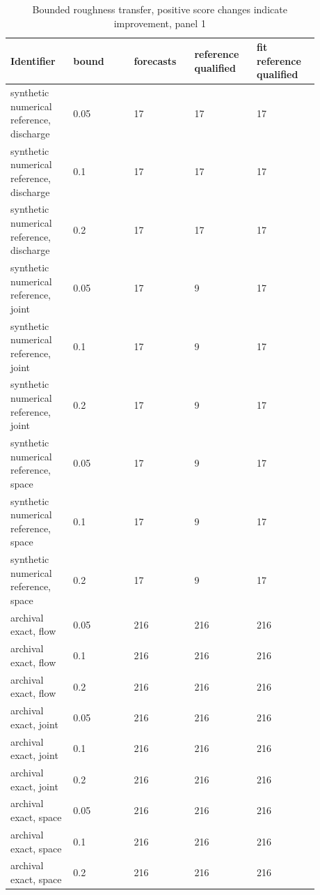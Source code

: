 \begingroup
\small
\setlength{\tabcolsep}{2pt}
\begin{longtable}{p{0.1760\linewidth}p{0.1760\linewidth}p{0.1760\linewidth}p{0.1760\linewidth}p{0.1760\linewidth}}
\caption{Bounded roughness transfer, positive score changes indicate improvement, panel 1}\\
\hline
Identifier & bound & forecasts & reference qualified & fit reference qualified \\
\hline\endhead
synthetic numerical reference, discharge & 0.05 & 17 & 17 & 17 \\
synthetic numerical reference, discharge & 0.1 & 17 & 17 & 17 \\
synthetic numerical reference, discharge & 0.2 & 17 & 17 & 17 \\
synthetic numerical reference, joint & 0.05 & 17 & 9 & 17 \\
synthetic numerical reference, joint & 0.1 & 17 & 9 & 17 \\
synthetic numerical reference, joint & 0.2 & 17 & 9 & 17 \\
synthetic numerical reference, space & 0.05 & 17 & 9 & 17 \\
synthetic numerical reference, space & 0.1 & 17 & 9 & 17 \\
synthetic numerical reference, space & 0.2 & 17 & 9 & 17 \\
archival exact, flow & 0.05 & 216 & 216 & 216 \\
archival exact, flow & 0.1 & 216 & 216 & 216 \\
archival exact, flow & 0.2 & 216 & 216 & 216 \\
archival exact, joint & 0.05 & 216 & 216 & 216 \\
archival exact, joint & 0.1 & 216 & 216 & 216 \\
archival exact, joint & 0.2 & 216 & 216 & 216 \\
archival exact, space & 0.05 & 216 & 216 & 216 \\
archival exact, space & 0.1 & 216 & 216 & 216 \\
archival exact, space & 0.2 & 216 & 216 & 216 \\
\end{longtable}
